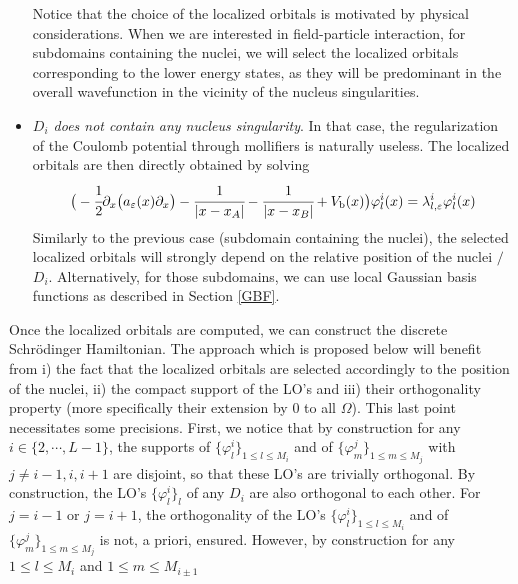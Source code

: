 \documentclass[11pt]{elsarticle}
\let \leq \leqslant
\let \epsilon \varepsilon
\begin{document}
\begin{itemize}
Notice that the choice of the localized orbitals is motivated by physical considerations.  When we are interested in field-particle interaction, for subdomains containing the nuclei, we will select the localized orbitals corresponding to the lower energy states, as they will be predominant in the overall wavefunction in the vicinity of the nucleus singularities.
\item {\it $D_i$ does not contain any nucleus singularity}. In that case, the regularization  of the Coulomb potential through mollifiers is naturally useless. The localized orbitals are then directly obtained by solving
\begin{eqnarray*}
\big(-\cfrac{1}{2}\partial_{x}\big(a_{\epsilon}(x)\partial_x\big)  - \cfrac{1}{|x-x_A|} - \cfrac{1}{|x-x_B|}+ V_{\textrm{b}}(x)\big)\varphi_{l}^{i}(x) = \lambda^{i}_{l,\epsilon}\varphi_{l}^{i}(x)
\end{eqnarray*}
Similarly to the previous case (subdomain containing the nuclei), the selected localized orbitals will strongly depend on the relative position of the nuclei $/$ $D_i$. Alternatively, for those subdomains, we can use local Gaussian basis functions as described in Section \ref{GBF}.
\end{itemize}
Once the localized orbitals are computed, we can construct the discrete Schr\"odinger Hamiltonian. The approach which is proposed below will benefit from i) the fact that the localized orbitals are selected accordingly to the position of the nuclei, ii) the compact support of the LO's and iii) their orthogonality property (more specifically their extension by $0$ to all $\Omega$). This last point necessitates some precisions. First, we notice that by construction for any $i \in \{2,\cdots,L-1\}$, the supports of $\{\varphi_l^{i}\big\}_{1\leq l\leq M_i}$ and of $\{\varphi_m^{j}\big\}_{1\leq m\leq M_{j}}$ with $j \neq i-1,i,i+1$ are disjoint, so that these LO's are trivially orthogonal. By construction, the LO's $\{\varphi_l^{i}\big\}_l$ of any $D_i$ are also orthogonal to each other. For $j=i-1$ or  $j=i+1$, the orthogonality of the LO's $\{\varphi_l^{i}\big\}_{1\leq l\leq M_i}$ and of $\{\varphi_m^{j}\big\}_{1\leq m\leq M_j}$ is not, a priori, ensured. However, by construction for any $1\leq l \leq M_i$ and $1\leq m \leq M_{i\pm 1}$
\end{document}
